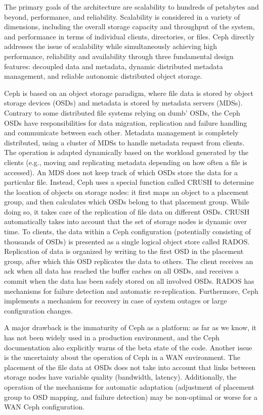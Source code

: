 \documentclass[11pt]{article}
\begin{document}
The primary goals of the architecture are scalability to hundreds of 
petabytes and beyond, performance, and reliability. Scalability is 
considered in a variety of dimensions, including the overall storage 
capacity and throughput of the system, and performance in terms of 
individual clients, directories, or files. Ceph directly addresses the 
issue of scalability while simultaneously achieving high performance, 
reliability and availability through three fundamental design features: 
decoupled data and metadata, dynamic distributed metadata management, 
and reliable autonomic distributed object storage.

Ceph is based on an object storage paradigm, where file data is stored 
by object storage devices (OSDs) and metadata is stored by metadata 
servers (MDSs). Contrary to some distributed file systems relying on 
dumb’ OSDs, the Ceph OSDs have responsibilities for data migration, 
replication and failure handling and communicate between each other. 
Metadata management is completely distributed, using a cluster of MDSs 
to handle metadata request from clients. The operation is adapted 
dynamically based on the workload generated by the clients (e.g., moving 
and replicating metadata depending on how often a file is accessed).
An MDS does not keep track of which OSDs store the data for a particular 
file. Instead, Ceph uses a special function called CRUSH to determine the 
location of objects on storage nodes: it first maps an object to a 
placement group, and then calculates which OSDs belong to that placement 
group. While doing so, it takes care of the replication of file data on 
different OSDs. CRUSH automatically takes into account that the set of 
storage nodes is dynamic over time. To clients, the data within a Ceph 
configuration (potentially consisting of thousands of OSDs) is presented 
as a single logical object store called RADOS. Replication of data is 
organized by writing to the first OSD in the placement group, after which 
this OSD replicates the data to others. The client receives an ack when 
all data has reached the buffer caches on all OSDs, and receives a commit 
when the data has been safely stored on all involved OSDs. RADOS has 
mechanisms for failure detection and automatic re-replication. Furthermore, 
Ceph implements a mechanism for recovery in case of system outages or 
large configuration changes.

A major drawback is the immaturity of Ceph as a platform: as far as we know, 
it has not been widely used in a production environment, and the Ceph 
documentation also explicitly warns of the beta state of the code. Another 
issue is the uncertainty about the operation of Ceph in a WAN environment. 
The placement of the file data at OSDs does not take into account that 
links between storage nodes have variable quality (bandwidth, latency). 
Additionally, the operation of the mechanisms for automatic adaptation 
(adjustment of placement group to OSD mapping, and failure detection) 
may be non-optimal or worse for a WAN Ceph configuration.
\end{document}

